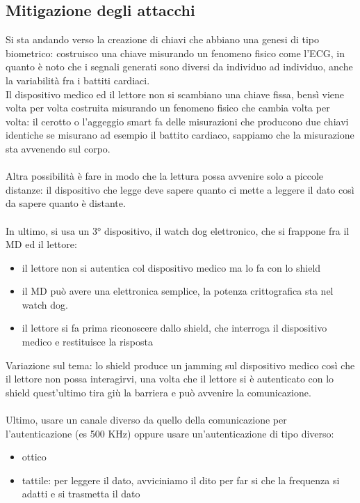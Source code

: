 \documentclass[oneside, 12pt]{extbook}
\begin{document}
\subsection{Mitigazione degli attacchi}
Si sta andando verso la creazione di chiavi che abbiano una genesi di tipo biometrico: costruisco una chiave misurando un fenomeno fisico come l'ECG, in quanto è noto che i segnali generati sono diversi da individuo ad individuo, anche la variabilità fra i battiti cardiaci.\\Il dispositivo medico ed il lettore non si scambiano una chiave fissa, bensì viene volta per volta costruita misurando un fenomeno fisico che cambia volta per volta: il cerotto o l'aggeggio smart fa delle misurazioni che producono due chiavi identiche se misurano ad esempio il battito cardiaco, sappiamo che la misurazione sta avvenendo sul corpo.\\\\Altra possibilità è fare in modo che la lettura possa avvenire solo a piccole distanze: il dispositivo che legge deve sapere quanto ci mette a leggere il dato così da sapere quanto è distante.\\\\In ultimo, si usa un 3° dispositivo, il watch dog elettronico, che si frappone fra il MD ed il lettore:
\begin{itemize}
	\item il lettore non si autentica col dispositivo medico ma lo fa con lo shield
	\item il MD può avere una elettronica semplice, la potenza crittografica sta nel watch dog.
	\item il lettore si fa prima riconoscere dallo shield, che interroga il dispositivo medico e restituisce la risposta
\end{itemize}
Variazione sul tema: lo shield produce un jamming sul dispositivo medico così che il lettore non possa interagirvi, una volta che il lettore si è autenticato con lo shield quest'ultimo tira giù la barriera e può avvenire la comunicazione.\\\\Ultimo, usare un canale diverso da quello della comunicazione per l'autenticazione (es 500 KHz) oppure usare un'autenticazione di tipo diverso:
\begin{itemize}
	\item ottico
	\item tattile: per leggere il dato, avviciniamo il dito per far si che la frequenza si adatti e si trasmetta il dato
\end{itemize}
\end{document}
